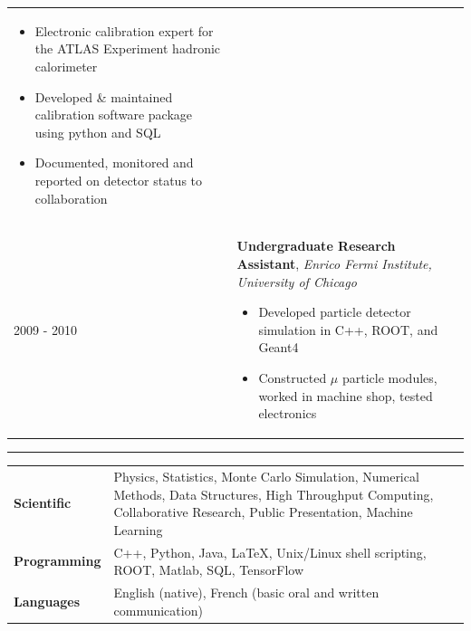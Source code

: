 \documentclass{letter}
\begin{document}
\begin{tabular}{p{}p{}}
\begin{itemize}
		\itemsep0em
		\renewcommand{\labelitemi}{\tiny$\blacksquare$} 
   		\item Electronic calibration expert for the ATLAS Experiment hadronic calorimeter
   		\item Developed \& maintained calibration software package using python and SQL
    		\item Documented, monitored and reported on detector status to collaboration
	\end{itemize}
\\
	2009 - 2010
	&
	\textbf{Undergraduate Research Assistant}, \textit{Enrico Fermi Institute, University of Chicago} \newline
	\vspace{-15pt}      %
	\begin{itemize}
		\itemsep0em
		\renewcommand{\labelitemi}{\tiny$\blacksquare$} 
   		\item Developed particle detector simulation in C++, ROOT, and Geant4 
   		\item Constructed $\mu$ particle modules, worked in machine shop, tested electronics 
	\end{itemize}
\end{tabular}

\vspace{-10pt}

\begin{flushleft}
\Large{\textsc{\textbf{\color{Maroon}{Skills}}}}
\vspace{1pt} %
\hrule
\end{flushleft}

\begin{tabular}{p{}p{}}
	{\bf Scientific} 
	&
	Physics, Statistics, Monte Carlo Simulation, Numerical Methods, Data Structures, High Throughput Computing, Collaborative Research, Public Presentation, Machine Learning \newline
\\
	{\bf Programming} 
	&
	C++, Python, Java, \LaTeX{}, Unix/Linux shell scripting, ROOT, Matlab, SQL, TensorFlow \newline
\\ 
	{\bf Languages}
	&
	English (native), French (basic oral and written communication)
\end{tabular}
\end{document}
